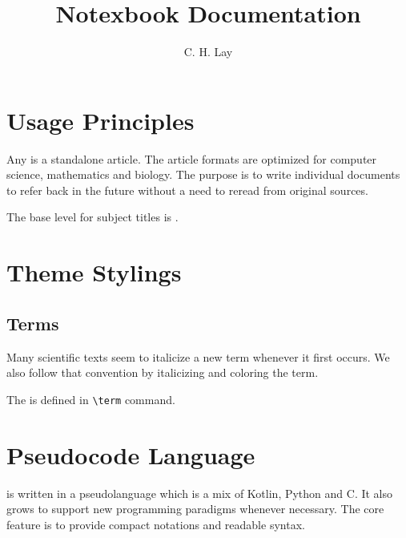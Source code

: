 \documentclass{book}
\title{Notexbook Documentation}
\author{C. H. Lay}
\begin{document}
\maketitle
\tableofcontents

\chapter{Usage Principles}
Any  is a standalone article.
The article formats are optimized for computer science, mathematics and biology.
The purpose is to write individual documents to refer back in the future without
a need to reread from original sources.

The base level for subject titles is .

\chapter{Theme Stylings}
\section{Terms}
Many scientific texts seem to italicize a new term whenever it first occurs.
We also follow that convention by italicizing and coloring the term.

\begin{example}
The  is defined in \verb|\term| command.
\end{example}

\chapter{Pseudocode Language}
 is written in a pseudolanguage which is a mix of Kotlin, Python and C.
It also grows to support new programming paradigms whenever necessary.
The core feature is to provide compact notations and readable syntax.
\end{document}
